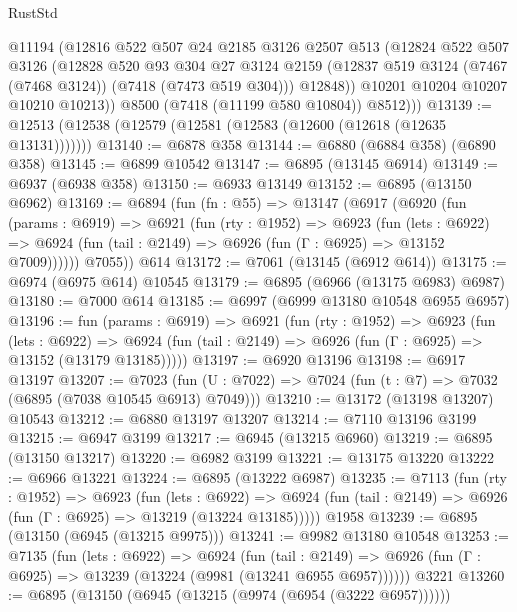 \begin{lexlean}{RustStd}
\begin{coremodule}
            @11194
            (@12816
              @522
              @507
              @24
              @2185
              @3126
              @2507
              @513
              (@12824
                @522
                @507
                @3126
                (@12828
                  @520
                  @93
                  @304
                  @27
                  @3124
                  @2159
                  (@12837 @519 @3124 (@7467 (@7468 @3124)) (@7418 (@7473 @519 @304)))
                  @12848))
              @10201
              @10204
              @10207
              @10210
              @10213))
          @8500
          (@7418 (@11199 @580 @10804))
          @8512)))
@13139 := @12513 (@12538 (@12579 (@12581 (@12583 (@12600 (@12618 (@12635 @13131)))))))
@13140 := @6878 @358
@13144 := @6880 (@6884 @358) (@6890 @358)
@13145 := @6899 @10542
@13147 := @6895 (@13145 @6914)
@13149 := @6937 (@6938 @358)
@13150 := @6933 @13149
@13152 := @6895 (@13150 @6962)
@13169 := @6894
    (fun (fn : @55) =>
    @13147
      (@6917
        (@6920
          (fun (params : @6919) =>
          @6921
            (fun (rty : @1952) =>
            @6923
              (fun (lets : @6922) =>
              @6924 (fun (tail : @2149) => @6926 (fun (Γ : @6925) => @13152 @7009))))))
        @7055))
    @614
@13172 := @7061 (@13145 (@6912 @614))
@13175 := @6974 (@6975 @614) @10545
@13179 := @6895 (@6966 (@13175 @6983) @6987)
@13180 := @7000 @614
@13185 := @6997 (@6999 @13180 @10548 @6955 @6957)
@13196 := fun (params : @6919) =>
  @6921
    (fun (rty : @1952) =>
    @6923
      (fun (lets : @6922) =>
      @6924 (fun (tail : @2149) => @6926 (fun (Γ : @6925) => @13152 (@13179 @13185)))))
@13197 := @6920 @13196
@13198 := @6917 @13197
@13207 := @7023
    (fun (U : @7022) => @7024 (fun (t : @7) => @7032 (@6895 (@7038 @10545 @6913) @7049)))
@13210 := @13172 (@13198 @13207) @10543
@13212 := @6880 @13197 @13207
@13214 := @7110 @13196 @3199
@13215 := @6947 @3199
@13217 := @6945 (@13215 @6960)
@13219 := @6895 (@13150 @13217)
@13220 := @6982 @3199
@13221 := @13175 @13220
@13222 := @6966 @13221
@13224 := @6895 (@13222 @6987)
@13235 := @7113
    (fun (rty : @1952) =>
    @6923
      (fun (lets : @6922) =>
      @6924 (fun (tail : @2149) => @6926 (fun (Γ : @6925) => @13219 (@13224 @13185)))))
    @1958
@13239 := @6895 (@13150 (@6945 (@13215 @9975)))
@13241 := @9982 @13180 @10548
@13253 := @7135
    (fun (lets : @6922) =>
    @6924
      (fun (tail : @2149) =>
      @6926 (fun (Γ : @6925) => @13239 (@13224 (@9981 (@13241 @6955 @6957))))))
    @3221
@13260 := @6895 (@13150 (@6945 (@13215 (@9974 (@6954 (@3222 @6957))))))

\end{coremodule}
\end{lexlean}
